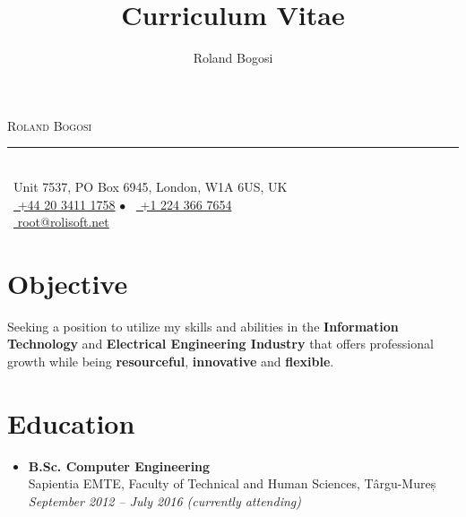 \documentclass[11pt,a4paper]{article}
\author{Roland Bogosi}
\title{Curriculum Vitae}
\begin{document}
	\begin{center}
	\textsc{\Huge Roland Bogosi}\\
	\vspace{-2mm}
	\rule{300pt\color{LightGray}}{0.5px}\\
	\vspace{0.5mm}
	{\lsstyle\color{DarkGray} \faGlobe\ Unit 7537, PO Box 6945, London, W1A 6US, UK\\
	\faPhone\ \href{tel:+442034111758}{\color{DarkGray} +44 20 3411 1758} {\color{LightGray}$\bullet$} \faPhone\ \href{tel:+12243667654}{\color{DarkGray} +1 224 366 7654}\\
	\faEnvelopeO\ \href{mailto:root@rolisoft.net}{\color{DarkGray} root@rolisoft.net}}
	\end{center}

\section*{Objective}
	Seeking a position to utilize my skills and abilities in the \textbf{Information Technology} and \textbf{Electrical Engineering Industry} that offers professional growth while being \textbf{resourceful}, \textbf{innovative} and \textbf{flexible}.

\section*{Education}
	\begin{itemize}
	\item	{\large\textbf{B.Sc. Computer Engineering}}\\
			Sapientia EMTE, Faculty of Technical and Human Sciences, Târgu-Mureș\\
			\textit{September 2012 – July 2016 (currently attending)}
	\end{itemize}
\end{document}
